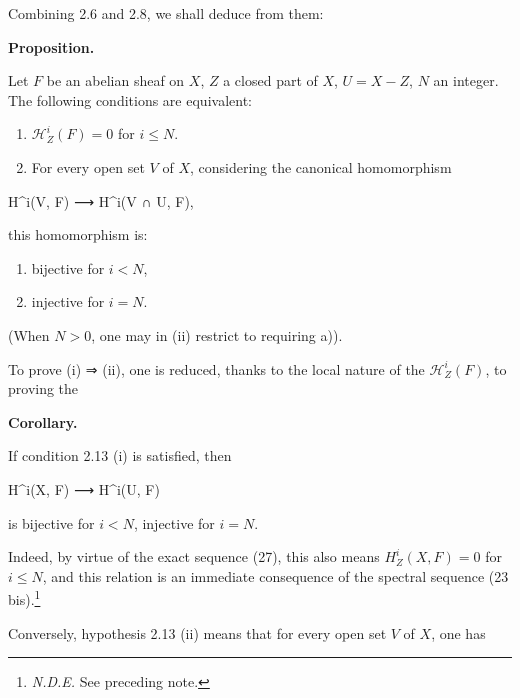 \documentclass[
]{article}
\newenvironment{Shaded}{}{}
\newcommand{\NormalTok}[1]{#1}
\begin{document}
Combining 2.6 and 2.8, we shall deduce from them:

\textbf{Proposition.}

Let \(F\) be an abelian sheaf on \(X\), \(Z\) a closed part of \(X\),
\(U = X - Z\), \(N\) an integer. The following conditions are
equivalent:

\begin{enumerate}
\def\labelenumi{(\roman{enumi})}
\item
  \(\mathcal{H}^{i}_{Z}(F) = 0\) for \(i \leqslant N\).
\item
  For every open set \(V\) of \(X\), considering the canonical
  homomorphism
\end{enumerate}

\begin{Shaded}
\begin{Highlighting}[]
\NormalTok{H\^{}i(V, F) ⟶ H\^{}i(V ∩ U, F),}
\end{Highlighting}
\end{Shaded}

this homomorphism is:

\begin{enumerate}
\def\labelenumi{\alph{enumi})}
\item
  bijective for \(i < N\),
\item
  injective for \(i = N\).
\end{enumerate}

(When \(N > 0\), one may in (ii) restrict to requiring a)).

To prove (i) ⇒ (ii), one is reduced, thanks to the local nature of the
\(\mathcal{H}^{i}_{Z}(F)\), to proving the

\textbf{Corollary.}

If condition 2.13 (i) is satisfied, then

\begin{Shaded}
\begin{Highlighting}[]
\NormalTok{H\^{}i(X, F) ⟶ H\^{}i(U, F)}
\end{Highlighting}
\end{Shaded}

is bijective for \(i < N\), injective for \(i = N\).

Indeed, by virtue of the exact sequence (27), this also means
\(H^{i}_{Z}(X, F) = 0\) for \(i \leqslant N\), and this relation is an
immediate consequence of the spectral sequence (23 bis).\footnote{\emph{N.D.E.}
  See preceding note.}

Conversely, hypothesis 2.13 (ii) means that for every open set \(V\) of
\(X\), one has
\end{document}
